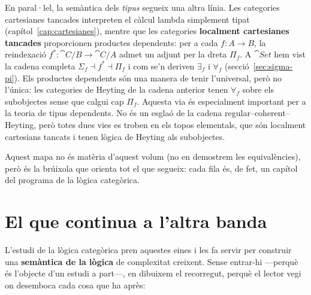 En paral·lel, la semàntica dels \emph{tipus} segueix una altra línia. Les categories cartesianes tancades interpreten el càlcul lambda simplement tipat (capítol~\ref{cap:cartesianes}), mentre que les categories \textbf{localment cartesianes tancades} proporcionen productes dependents: per a cada $f\colon A\to B$, la reindexació $f^{*}\colon\cat{C}/B\to\cat{C}/A$ admet un adjunt per la dreta $\Pi_f$. A $\cat{Set}$ hem vist la cadena completa $\Sigma_f\dashv f^{*}\dashv\Pi_f$ i com se'n deriven $\exists_f$ i $\forall_f$ (secció~\ref{sec:sigma-pi}). Els productes dependents són una manera de tenir l'universal, però no l'única: les categories de Heyting de la cadena anterior tenen $\forall_f$ sobre els subobjectes sense que calgui cap $\Pi_f$. Aquesta via és especialment important per a la teoria de tipus dependents. No és un esglaó de la cadena regular--coherent--Heyting, però totes dues vies es troben en els topos elementals, que són localment cartesians tancats i tenen lògica de Heyting als subobjectes.

Aquest mapa no és matèria d'aquest volum (no en demostrem les equivalències), però és la brúixola que orienta tot el que segueix: cada fila és, de fet, un capítol del programa de la lògica categòrica.

\section{El que continua a l'altra banda}

L'estudi de la lògica categòrica pren aquestes eines i les fa servir per construir una \textbf{semàntica de la lògica} de complexitat creixent. Sense entrar-hi ---perquè és l'objecte d'un estudi a part---, en dibuixem el recorregut, perquè el lector vegi on desemboca cada cosa que ha après:

